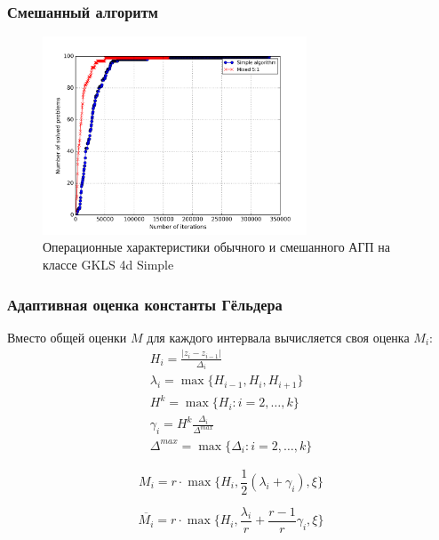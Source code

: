 \documentclass[aspectratio=1610]{beamer}
\begin{document}
\begin{frame}
  \frametitle{Смешанный алгоритм}
  \begin{figure}
    \center
      \includegraphics[width=0.7\textwidth]{mixed_op4d.png}
      \caption*{Операционные характеристики обычного и смешанного АГП на классе GKLS 4d Simple}
  \end{figure}
\end{frame}

\begin{frame}
\frametitle{Адаптивная оценка константы Гёльдера}
  Вместо общей оценки \(M\) для каждого интервала вычисляется своя оценка \(M_i\):
  \begin{displaymath}
    \begin{array}{c}
      H_i=\frac{|z_i-z_{i-1}|}{\Delta_i} \\
      \lambda_i=\max\{H_{i-1},H_i,H_{i+1}\} \\
      H^k=\max\{H_i:i=2,\dots ,k\} \\
      \gamma_i=H^k\frac{\Delta_i}{\Delta^{max}} \\
      \Delta^{max}=\max\{\Delta_{i}:i=2,\dots ,k\}
    \end{array}
  \end{displaymath}

  \begin{displaymath}
    M_i=r\cdot \max\{H_i, \frac{1}{2}(\lambda_i+\gamma_i),\xi\}
  \end{displaymath}

  \begin{displaymath}
    \overline{M_i}=r\cdot \max\{H_i, \frac{\lambda_i}{r}+\frac{r-1}{r}\gamma_i,\xi\}
  \end{displaymath}
\end{frame}
\end{document}
